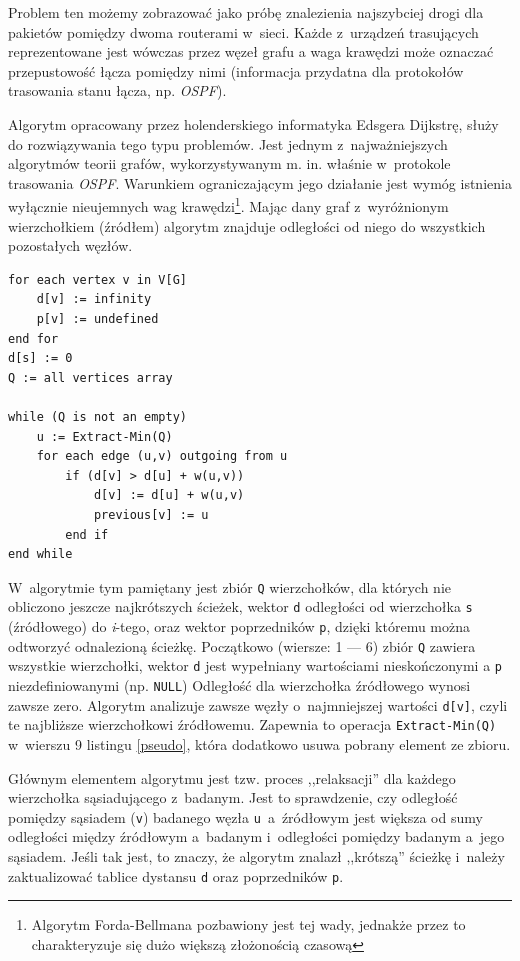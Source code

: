 \documentclass[a4paper,12pt,polish,twoside,openright]{thesis}
\newcommand\code[1]{\lstinline[style=line]{#1}}
\begin{document}
Problem ten możemy zobrazować jako próbę znalezienia najszybciej drogi dla pakietów pomiędzy dwoma routerami w~sieci.
Każde z~urządzeń trasujących reprezentowane jest wówczas przez węzeł grafu a waga krawędzi może oznaczać przepustowość łącza pomiędzy nimi (informacja przydatna dla protokołów trasowania stanu łącza, np. \emph{OSPF}\cite{ospf}).

Algorytm opracowany przez holenderskiego informatyka Edsgera Dijkstrę, służy do rozwiązywania tego typu problemów.
Jest jednym z~najważniejszych algorytmów teorii grafów, wykorzystywanym m. in. właśnie w~protokole trasowania \emph{OSPF}.
Warunkiem ograniczającym jego działanie jest wymóg istnienia wyłącznie nieujemnych wag krawędzi\footnote{Algorytm Forda-Bellmana pozbawiony jest tej wady, jednakże przez to charakteryzuje się dużo większą złożonością czasową\cite{graphtheory}}.
Mając dany graf z~wyróżnionym wierzchołkiem (źródłem) algorytm znajduje odległości od niego do wszystkich pozostałych węzłów.

\begin{lstlisting}[style=code,caption=Pseudokod algorytmu Dijkstry\cite{dijkstra},label=pseudo]
for each vertex v in V[G]
	d[v] := infinity
	p[v] := undefined
end for
d[s] := 0
Q := all vertices array

while (Q is not an empty)
	u := Extract-Min(Q)
	for each edge (u,v) outgoing from u
		if (d[v] > d[u] + w(u,v))
			d[v] := d[u] + w(u,v)
			previous[v] := u
		end if
end while
\end{lstlisting}
W~algorytmie tym pamiętany jest zbiór \code{Q} wierzchołków, dla których nie obliczono jeszcze najkrótszych ścieżek, wektor \code{d} odległości od wierzchołka \code{s} (źródłowego) do \emph{i}-tego, oraz wektor poprzedników \code{p}, dzięki któremu można odtworzyć odnalezioną ścieżkę.
Początkowo (wiersze: 1 --- 6) zbiór \code{Q} zawiera wszystkie wierzchołki, wektor \code{d} jest wypełniany wartościami nieskończonymi a \code{p} niezdefiniowanymi (np. \code{NULL})
Odległość dla wierzchołka źródłowego wynosi zawsze zero.
Algorytm analizuje zawsze węzły o~najmniejszej wartości \code{d[v]}, czyli te najbliższe wierzchołkowi źródłowemu.
Zapewnia to operacja \code{Extract-Min(Q)} w~wierszu 9 listingu \ref{pseudo}, która dodatkowo usuwa pobrany element ze zbioru.

Głównym elementem algorytmu jest tzw. proces ,,relaksacji'' dla każdego wierzchołka sąsiadującego z~badanym.
Jest to sprawdzenie, czy odległość pomiędzy sąsiadem (\code{v}) badanego węzła \code{u}~a~źródłowym jest większa od sumy odległości między źródłowym a~badanym i~odległości pomiędzy badanym a~jego sąsiadem.
Jeśli tak jest, to znaczy, że algorytm znalazł ,,krótszą'' ścieżkę i~należy zaktualizować tablice dystansu \code{d} oraz poprzedników \code{p}.
\end{document}
